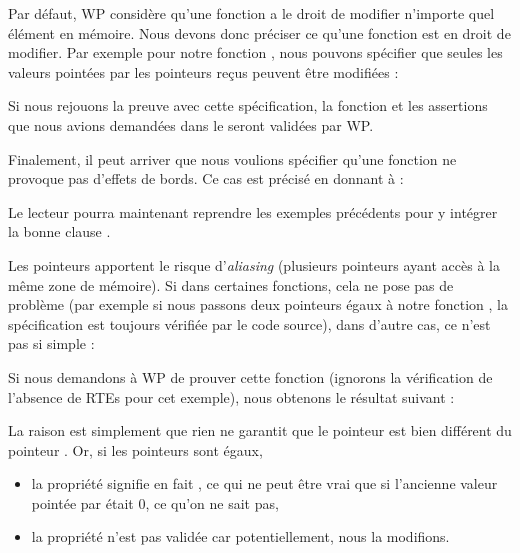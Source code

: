 Par défaut, WP considère qu'une fonction a le droit de modifier n'importe quel
élément en mémoire. Nous devons donc préciser ce qu'une fonction est en droit
de modifier. Par exemple pour notre fonction , nous pouvons
spécifier que seules les valeurs pointées par les pointeurs reçus peuvent être
modifiées :






Si nous rejouons la preuve avec cette spécification, la fonction et les
assertions que nous avions demandées dans le  seront validées par WP.



Finalement, il peut arriver que nous voulions spécifier qu'une fonction ne
provoque pas d'effets de bords. Ce cas est précisé en donnant 
à  :






Le lecteur pourra maintenant reprendre les exemples précédents pour y intégrer
la bonne clause .





Les pointeurs apportent le risque d'\textit{aliasing} (plusieurs pointeurs ayant accès à
la même zone de mémoire). Si dans certaines fonctions, cela ne pose pas de
problème (par exemple si nous passons deux pointeurs égaux
à notre fonction , la spécification est toujours vérifiée par le
code source), dans d'autre cas, ce n'est pas si simple :






Si nous demandons à WP de prouver cette fonction (ignorons la vérification de
l'absence de RTEs pour cet exemple), nous obtenons le résultat suivant :





La raison est simplement que rien ne garantit que le pointeur  est bien
différent du pointeur . Or, si les pointeurs sont égaux,



\begin{itemize}
\item la propriété  signifie en fait
, ce qui ne peut être vrai que si l'ancienne valeur
pointée par  était 0, ce qu'on ne sait pas,
\item la propriété  n'est pas validée car potentiellement,
nous la modifions.
\end{itemize}


